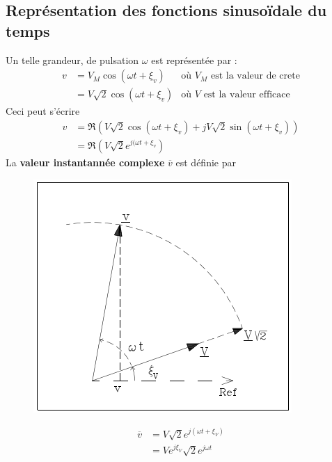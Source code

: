 	\subsection{Représentation des fonctions sinusoïdale du temps}
	Un telle grandeur, de pulsation $\omega$ est représentée par :
	\begin{equation}
	\begin{array}{lll}
	v &= V_M\cos(\omega t + \xi_v) & \text{où $V_M$ est la valeur de crete}\\
	 &= V\sqrt{2}\cos(\omega t + \xi_v) & \text{où $V$ est la valeur efficace}	
	\end{array}
	\end{equation}
	Ceci peut s'écrire 
	\begin{equation}
	\begin{array}{ll}
	v &= \Re (V\sqrt{2}\cos(\omega t + \xi_v) + jV\sqrt{2}\sin(\omega t + \xi_v))\\
	 &= \Re (V\sqrt{2}e^{j(\omega t + \xi_v})
	\end{array}
	\end{equation}
	La \textbf{valeur instantannée complexe} $\overline{v}$ est définie par \\
		\begin{figure}
	\vspace{-15mm}
	\includegraphics[scale=0.4]{ch1/image2.png}
	\end{figure}
	\begin{equation}
	\begin{array}{ll}
	\overline{v} &= V \sqrt{2}e^{j(\omega t + \xi_V)}\\
	 &= V e^{j\xi_V}\sqrt{2}e^{j\omega t}
	\end{array}
	\end{equation}

